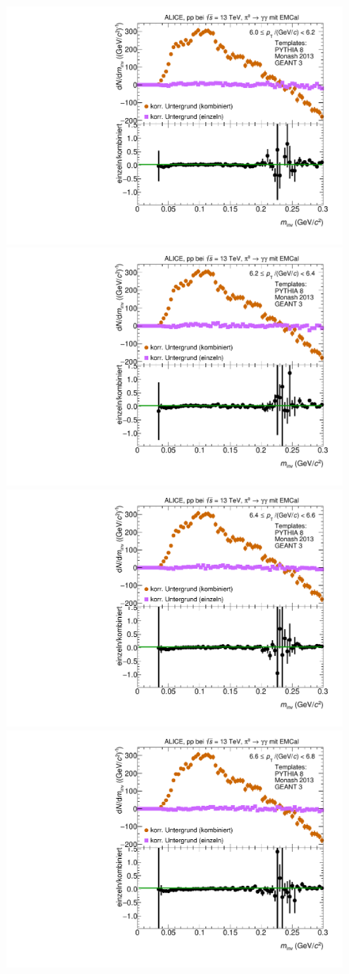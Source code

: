 \begin{figure}[t]
\begin{multicols}{2}
\end{multicols}
\begin{multicols}{2}
    \includegraphics[width=.65\linewidth]{Anhang/BackgroundWithRatio24_Data_2016.pdf}\par
    \includegraphics[width=.65\linewidth]{Anhang/BackgroundWithRatio25_Data_2016.pdf}\par
\end{multicols}
\begin{multicols}{2}
    \includegraphics[width=.65\linewidth]{Anhang/BackgroundWithRatio26_Data_2016.pdf}\par
    \includegraphics[width=.65\linewidth]{Anhang/BackgroundWithRatio27_Data_2016.pdf}\par
\end{multicols}
\end{figure}
\clearpage

